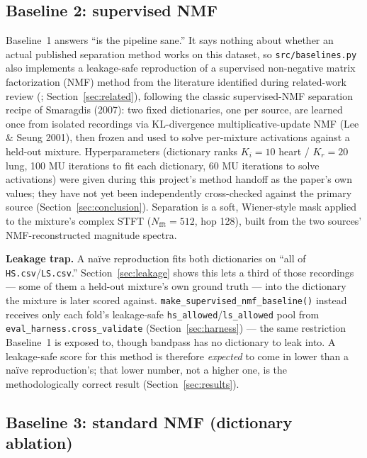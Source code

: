 \documentclass[11pt]{article}
\begin{document}
\subsection{Baseline 2: supervised NMF}
\label{sec:baseline2}

Baseline~1 answers ``is the pipeline sane.'' It says nothing about whether
an actual published separation method works on this dataset, so
\texttt{src/baselines.py} also implements a leakage-safe reproduction of a
supervised non-negative matrix factorization (NMF) method from the
literature identified during related-work review
(\cite{nmfcrnn}; Section~\ref{sec:related}), following the classic
supervised-NMF separation recipe of Smaragdis (2007): two fixed
dictionaries, one per source, are learned once from isolated recordings via
KL-divergence multiplicative-update NMF (Lee \& Seung 2001), then frozen and
used to solve per-mixture activations against a held-out mixture.
Hyperparameters (dictionary ranks $K_i{=}10$ heart / $K_r{=}20$ lung, 100 MU
iterations to fit each dictionary, 60 MU iterations to solve activations)
were given during this project's method handoff as the paper's own values;
they have not yet been independently cross-checked against the primary
source (Section~\ref{sec:conclusion}). Separation is a soft, Wiener-style
mask applied to the mixture's complex STFT ($N_{\text{fft}}{=}512$,
hop 128), built from the two sources' NMF-reconstructed magnitude spectra.

\textbf{Leakage trap.} A na\"ive reproduction fits both dictionaries on
``all of \texttt{HS.csv}/\texttt{LS.csv}.'' Section~\ref{sec:leakage} shows
this lets a third of those recordings --- some of them a held-out mixture's
own ground truth --- into the dictionary the mixture is later scored
against. \texttt{make\_supervised\_nmf\_baseline()} instead receives only
each fold's leakage-safe \texttt{hs\_allowed}/\texttt{ls\_allowed} pool from
\texttt{eval\_harness.cross\_validate} (Section~\ref{sec:harness}) --- the
same restriction Baseline~1 is exposed to, though bandpass has no
dictionary to leak into. A leakage-safe score for this method is therefore
\emph{expected} to come in lower than a na\"ive reproduction's; that lower
number, not a higher one, is the methodologically correct result
(Section~\ref{sec:results}).

\subsection{Baseline 3: standard NMF (dictionary ablation)}
\label{sec:baseline3}
\end{document}
